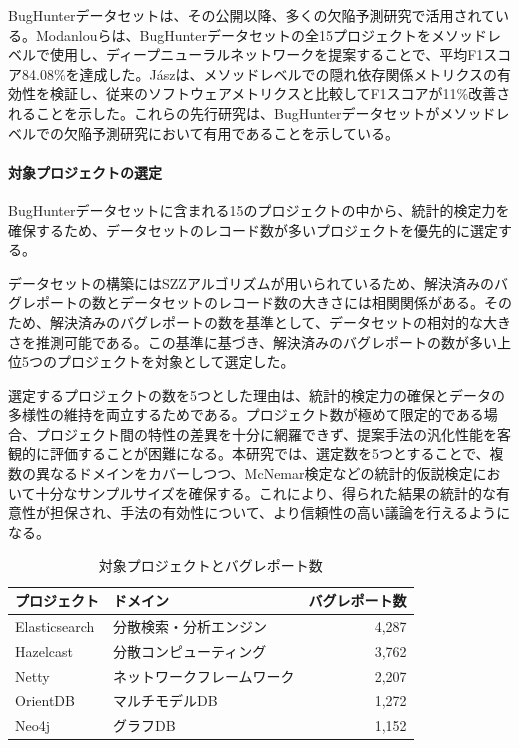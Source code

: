 BugHunterデータセットは、その公開以降、多くの欠陥予測研究で活用されている。Modanlouらは、BugHunterデータセットの全15プロジェクトをメソッドレベルで使用し、ディープニューラルネットワークを提案することで、平均F1スコア84.08\%を達成した\cite{modanlou2024}。Jászは、メソッドレベルでの隠れ依存関係メトリクスの有効性を検証し、従来のソフトウェアメトリクスと比較してF1スコアが11\%改善されることを示した\cite{jasz2024}。これらの先行研究は、BugHunterデータセットがメソッドレベルでの欠陥予測研究において有用であることを示している。

\paragraph{対象プロジェクトの選定}
BugHunterデータセットに含まれる15のプロジェクトの中から、統計的検定力を確保するため、データセットのレコード数が多いプロジェクトを優先的に選定する。

データセットの構築にはSZZアルゴリズム\cite{sliwerski2005}が用いられているため、解決済みのバグレポートの数とデータセットのレコード数の大きさには相関関係がある。そのため、解決済みのバグレポートの数を基準として、データセットの相対的な大きさを推測可能である。この基準に基づき、解決済みのバグレポートの数が多い上位5つのプロジェクトを対象として選定した。

選定するプロジェクトの数を5つとした理由は、統計的検定力の確保とデータの多様性の維持を両立するためである。プロジェクト数が極めて限定的である場合、プロジェクト間の特性の差異を十分に網羅できず、提案手法の汎化性能を客観的に評価することが困難になる。本研究では、選定数を5つとすることで、複数の異なるドメインをカバーしつつ、McNemar検定などの統計的仮説検定において十分なサンプルサイズを確保する。これにより、得られた結果の統計的な有意性が担保され、手法の有効性について、より信頼性の高い議論を行えるようになる。

\begin{table}[ht]
\centering
\caption{対象プロジェクトとバグレポート数}
\begin{tabular}{|l|l|r|}
\hline
プロジェクト & ドメイン & バグレポート数 \\
\hline
Elasticsearch\cite{elasticsearch} & 分散検索・分析エンジン & 4,287 \\
Hazelcast\cite{hazelcast} & 分散コンピューティング & 3,762 \\
Netty\cite{netty} & ネットワークフレームワーク & 2,207 \\
OrientDB\cite{orientdb} & マルチモデルDB & 1,272 \\
Neo4j\cite{neo4j} & グラフDB & 1,152 \\
\hline
\end{tabular}
\end{table}

